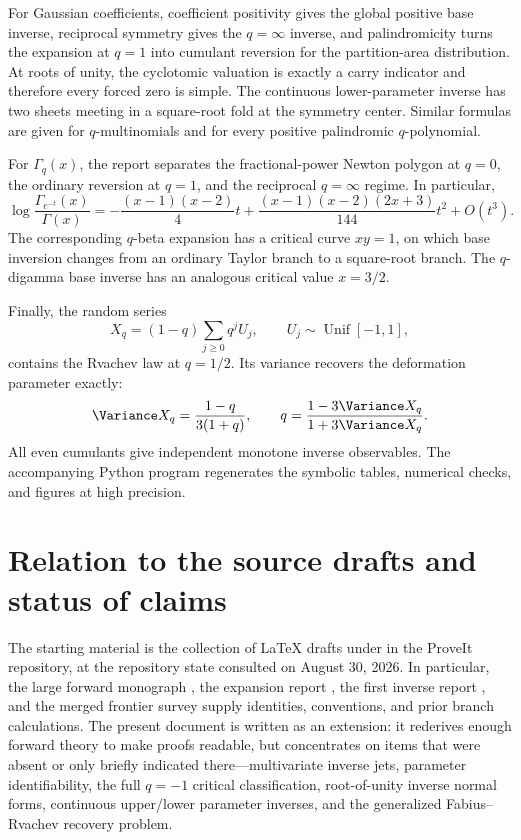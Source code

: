 \documentclass[11pt,letterpaper,oneside,openany]{book}
\theoremstyle{definition}
\theoremstyle{remark}
\begin{document}
For Gaussian coefficients, coefficient positivity gives the global positive
base inverse, reciprocal symmetry gives the \(q=\infty\) inverse, and
palindromicity turns the expansion at \(q=1\) into cumulant reversion for the
partition-area distribution.  At roots of unity, the cyclotomic valuation is
exactly a carry indicator and therefore every forced zero is simple.  The
continuous lower-parameter inverse has two sheets meeting in a square-root fold
at the symmetry center.  Similar formulas are given for \(q\)-multinomials and
for every positive palindromic \(q\)-polynomial.

For \(\Gamma_q(x)\), the report separates the fractional-power Newton polygon
at \(q=0\), the ordinary reversion at \(q=1\), and the reciprocal \(q=\infty\)
regime.  In particular,
\[
 \log\frac{\Gamma_{e^{-t}}(x)}{\Gamma(x)}
 =-\frac{(x-1)(x-2)}4t
 +\frac{(x-1)(x-2)(2x+3)}{144}t^2+O(t^3).
\]
The corresponding \(q\)-beta expansion has a critical curve \(xy=1\), on
which base inversion changes from an ordinary Taylor branch to a square-root
branch.  The \(q\)-digamma base inverse has an analogous critical value
\(x=3/2\).

Finally, the random series
\[
 X_q=(1-q)\sum_{j\ge0}q^jU_j,
 \qquad U_j\sim\operatorname{Unif}[-1,1],
\]
contains the Rvachev law at \(q=1/2\).  Its variance recovers the deformation
parameter exactly:
\[
 \Variance X_q=\frac{1-q}{3(1+q)},
 \qquad q=\frac{1-3\Variance X_q}{1+3\Variance X_q}.
\]
All even cumulants give independent monotone inverse observables.  The
accompanying Python program regenerates the symbolic tables, numerical checks,
and figures at high precision.

\chapter*{Relation to the source drafts and status of claims}
The starting material is the collection of \LaTeX{} drafts under
 in the ProveIt repository, at the repository state
consulted on August 30, 2026.  In particular, the large forward monograph
\cite{ReshetnikovMonograph}, the expansion report \cite{ReshetnikovExpansions},
the first inverse report \cite{ReshetnikovInverse}, and the merged frontier
survey \cite{ReshetnikovFrontiers} supply identities, conventions, and prior
branch calculations.  The present document is written as an extension: it
rederives enough forward theory to make proofs readable, but concentrates on
items that were absent or only briefly indicated there---multivariate inverse
jets, parameter identifiability, the full \(q=-1\) critical classification,
root-of-unity inverse normal forms, continuous upper/lower parameter inverses,
and the generalized Fabius--Rvachev recovery problem.
\end{document}

